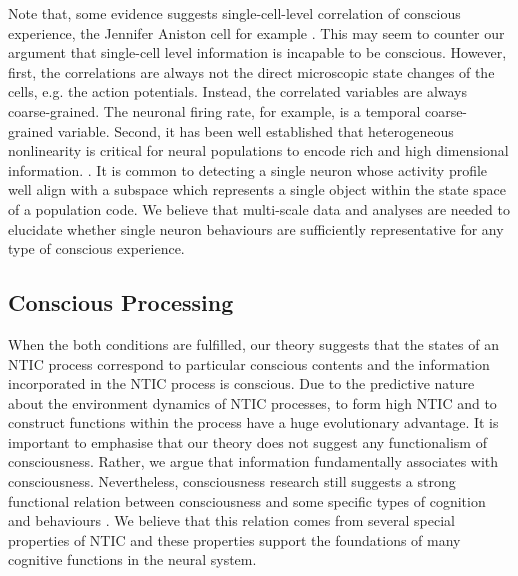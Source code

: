 \documentclass[utf8]{article}
\begin{document}
    
          Note that, some evidence suggests single-cell-level correlation of conscious experience, the Jennifer Aniston cell for example \citep{Quiroga2005Jun, Quiroga2012Jul}. This may seem to counter our argument that single-cell level information is incapable to be conscious. However, first, the correlations are always not the direct microscopic state changes of the cells, e.g. the action potentials. Instead, the correlated variables are always coarse-grained. The neuronal firing rate, for example, is a temporal coarse-grained variable. Second, it has been well established that heterogeneous nonlinearity is critical for neural populations to encode rich and high dimensional information. \citep{Chelaru2008, Rigotti2010Oct, Shamir2004Jun}. It is common to detecting a single neuron whose activity profile well align with a subspace which represents a single object within the state space of a population code. We believe that multi-scale data and analyses are needed to elucidate whether single neuron behaviours are sufficiently representative for any type of conscious experience. 


		\subsection{Conscious Processing}
		When the both conditions are fulfilled, our theory suggests that the states of an NTIC process correspond to particular conscious contents and the information incorporated in the NTIC process is conscious. Due to the predictive nature about the environment dynamics of NTIC processes, to form high NTIC and to construct functions within the process have a huge evolutionary advantage. It is important to emphasise that our theory does not suggest any functionalism of consciousness. Rather, we argue that information fundamentally associates with consciousness. Nevertheless, consciousness research still suggests a strong functional relation between consciousness and some specific types of cognition and behaviours \citep{Seth2009Encyclopediaofconsciousness}. We believe that this relation comes from several special properties of NTIC and these properties support the foundations of many cognitive functions in the neural system.
		
\end{document}
